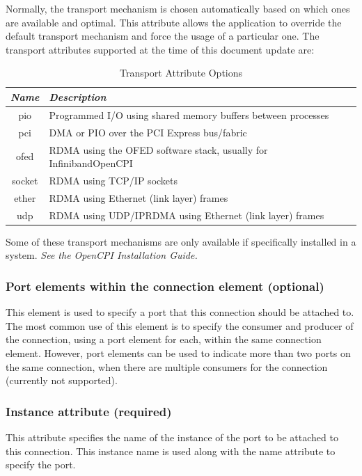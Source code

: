 \documentclass[10pt, a4paper, oneside]{article}
\renewcommand*{\arraystretch}{2.5}%
\renewcommand\_{\textunderscore\allowbreak} %
\begin{document}
Normally, the transport mechanism is chosen automatically based on which ones are available and optimal. This attribute allows the application to override the default transport mechanism and force the usage of a particular one. 
The transport attributes supported at the time of this document update are:\\

\begin{table}[h!]
\caption{Transport Attribute Options}
\renewcommand*{\arraystretch}{2.5}
\center
\begin{tabular}{|c|p{14cm}| }
\hline \emph{Name} & \emph{Description}\\
\hline 
pio & Programmed I/O using shared memory buffers between processes\\
\hline
pci & DMA or PIO over the PCI Express bus/fabric \\ 
\hline   
ofed & RDMA using the OFED software stack, usually for InfinibandOpenCPI \\ 
\hline 
socket & RDMA using TCP/IP sockets \\ 
\hline 
ether & RDMA using Ethernet (link layer) frames \\ 
\hline 
udp & RDMA using UDP/IPRDMA using Ethernet (link layer) frames \\ 
\hline
\end{tabular}
\end{table}
Some of these transport mechanisms are only available if specifically installed in a system.
\emph{See the OpenCPI Installation Guide.}
\subsubsection{Port elements within the connection element (optional)} This element is used to specify a port that this connection should be attached to. The most common use of this element is to specify the consumer and producer of the connection, using a {port} element for each, within the same connection element. However, port elements can be used to indicate more than two ports on the same connection, when there are multiple consumers for the connection (currently not supported).
\subsubsection{Instance attribute (required)} This attribute specifies the name of the instance of the port to be attached to this connection. This instance name is used along with the name attribute to specify the port.
\end{document}

